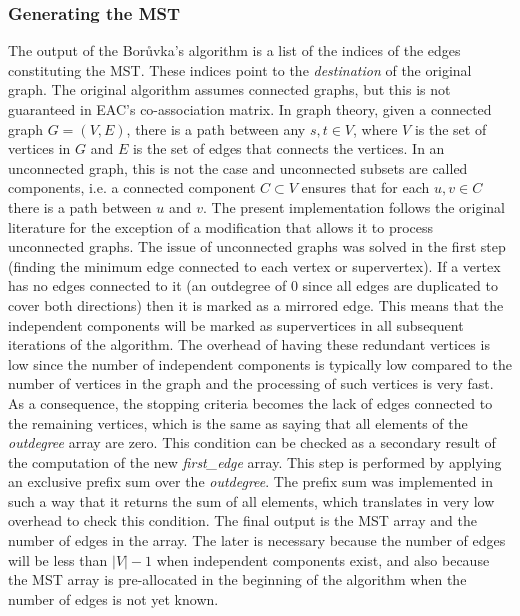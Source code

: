 \subsubsection{Generating the MST}
The output of the Borůvka's algorithm is a list of the indices of the edges constituting the MST. 
These indices point to the \emph{destination} of the original graph. 
The original algorithm \cite{Sousa2015} assumes connected graphs, but this is not guaranteed in EAC's co-association matrix.
In graph theory, given a connected graph $G = (V,E)$, there is a path between any $s,t \in V$, where $V$ is the set of vertices in $G$ and $E$ is the set of edges that connects the vertices.
In an unconnected graph, this is not the case and unconnected subsets are called components, i.e. a connected component $C \subset V$ ensures that for each $u,v \in C$ there is a path between $u$ and $v$.
The present implementation follows the original literature \cite{Sousa2015} for the exception of a modification that allows it to process unconnected graphs.
The issue of unconnected graphs was solved in the first step (finding the minimum edge connected to each vertex or supervertex). 
If a vertex has no edges connected to it (an outdegree of 0 since all edges are duplicated to cover both directions) then it is marked as a mirrored edge. 
This means that the independent components will be marked as supervertices in all subsequent iterations of the algorithm. 
The overhead of having these redundant vertices is low since the number of independent components is typically low compared to the number of vertices in the graph and the processing of such vertices is very fast.
As a consequence, the stopping criteria becomes the lack of edges connected to the remaining vertices, which is the same as saying that all elements of the \emph{outdegree} array are zero. 
This condition can be checked as a secondary result of the computation of the new \emph{first\_edge} array. 
This step is performed by applying an exclusive prefix sum over the \emph{outdegree}. 
The prefix sum was implemented in such a way that it returns the sum of all elements, which translates in very low overhead to check this condition.
The final output is the MST array and the number of edges in the array. 
The later is necessary because the number of edges will be less than $|V|-1$ when independent components exist, and also because the MST array is pre-allocated in the beginning of the algorithm when the number of edges is not yet known.

